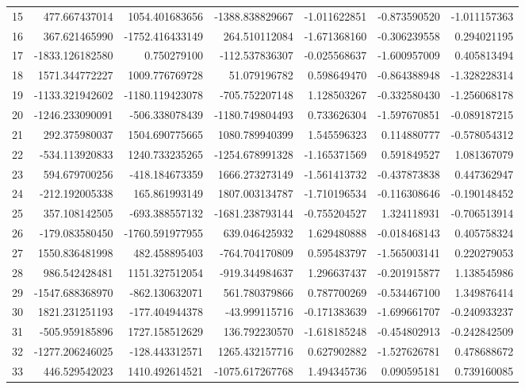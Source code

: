\begin{longtable}{rrrrrrr}
15 & 477.667437014 & 1054.401683656 & -1388.838829667 & -1.011622851 & -0.873590520 & -1.011157363 \\
16 & 367.621465990 & -1752.416433149 & 264.510112084 & -1.671368160 & -0.306239558 & 0.294021195 \\
17 & -1833.126182580 & 0.750279100 & -112.537836307 & -0.025568637 & -1.600957009 & 0.405813494 \\
18 & 1571.344772227 & 1009.776769728 & 51.079196782 & 0.598649470 & -0.864388948 & -1.328228314 \\
19 & -1133.321942602 & -1180.119423078 & -705.752207148 & 1.128503267 & -0.332580430 & -1.256068178 \\
20 & -1246.233090091 & -506.338078439 & -1180.749804493 & 0.733626304 & -1.597670851 & -0.089187215 \\
21 & 292.375980037 & 1504.690775665 & 1080.789940399 & 1.545596323 & 0.114880777 & -0.578054312 \\
22 & -534.113920833 & 1240.733235265 & -1254.678991328 & -1.165371569 & 0.591849527 & 1.081367079 \\
23 & 594.679700256 & -418.184673359 & 1666.273273149 & -1.561413732 & -0.437873838 & 0.447362947 \\
24 & -212.192005338 & 165.861993149 & 1807.003134787 & -1.710196534 & -0.116308646 & -0.190148452 \\
25 & 357.108142505 & -693.388557132 & -1681.238793144 & -0.755204527 & 1.324118931 & -0.706513914 \\
26 & -179.083580450 & -1760.591977955 & 639.046425932 & 1.629480888 & -0.018468143 & 0.405758324 \\
27 & 1550.836481998 & 482.458895403 & -764.704170809 & 0.595483797 & -1.565003141 & 0.220279053 \\
28 & 986.542428481 & 1151.327512054 & -919.344984637 & 1.296637437 & -0.201915877 & 1.138545986 \\
29 & -1547.688368970 & -862.130632071 & 561.780379866 & 0.787700269 & -0.534467100 & 1.349876414 \\
30 & 1821.231251193 & -177.404944378 & -43.999115716 & -0.171383639 & -1.699661707 & -0.240933237 \\
31 & -505.959185896 & 1727.158512629 & 136.792230570 & -1.618185248 & -0.454802913 & -0.242842509 \\
32 & -1277.206246025 & -128.443312571 & 1265.432157716 & 0.627902882 & -1.527626781 & 0.478688672 \\
33 & 446.529542023 & 1410.492614521 & -1075.617267768 & 1.494345736 & 0.090595181 & 0.739160085 \\

\end{longtable}
